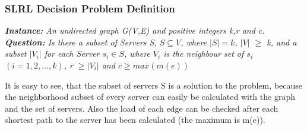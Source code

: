 \documentclass [12pt]{article}
\begin{document}
\subsubsection{SLRL Decision Problem Definition}

{\itshape \textbf{Instance:} An undirected graph G(V,E) and  positive integers k,r and c.\\
  \textbf{Question:} 
  Is there a subset of Servers S, $S \subseteq V$, where $|S| = k$, $|V|$ $\geq$ k,
  and a subset $|V_i|$ for each Server $s_i \in S$, where $V_i$ is the neighbour set of $s_i$ $(i=1,2,\dots,k)$, r $\geq  |V_i|$ 
and $c  \geq max(m(e))$}


It is easy to see, that the subset of servers S is a solution to the problem, because the neighborhood subset
of every server can easily be calculated with the graph and the set of servers. Also the load of each edge
can be checked after each shortest path to the server has been calculated (the maximum is m(e)).
\end{document}

